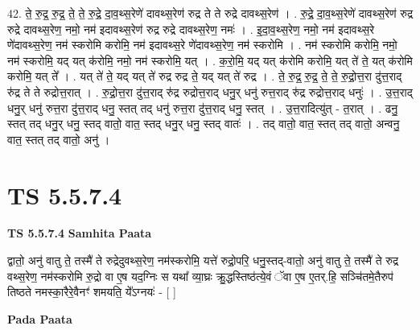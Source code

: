 \documentclass[17pt]{extarticle}
\begin{document}
42. ते॒ रु॒द्र॒ रु॒द्र॒ ते॒ ते॒ रु॒द्रे॒ दा॒व॒थ्स॒रेणे॑ दावथ्स॒रेण॑ रुद्र ते ते रुद्रे दावथ्स॒रेण॑ । . रु॒द्रे॒ दा॒व॒थ्स॒रेणे॑ दावथ्स॒रेण॑ रुद्र रुद्रे दावथ्स॒रेण॒ नमो॒ नम॑ इदावथ्स॒रेण॑ रुद्र रुद्रे दावथ्स॒रेण॒ नमः॑ । . इ॒दा॒व॒थ्स॒रेण॒ नमो॒ नम॑ इदावथ्स॒रे णे॑दावथ्स॒रेण॒ नम॑ स्करोमि करोमि॒ नम॑ इदावथ्स॒रे
णे॑दावथ्स॒रेण॒ नम॑ स्करोमि । . नम॑ स्करोमि करोमि॒ नमो॒ नम॑ स्करोमि॒ यद् यत् क॑रोमि॒ नमो॒ नम॑ स्करोमि॒ यत् । . क॒रो॒मि॒ यद् यत् क॑रोमि करोमि॒ यत् ते॑ ते॒ यत् क॑रोमि करोमि॒ यत् ते᳚ । . यत् ते॑ ते॒ यद् यत् ते॑ रुद्र रुद्र ते॒ यद् यत् ते॑ रुद्र । . ते॒ रु॒द्र॒ रु॒द्र॒ ते॒ ते॒ रु॒द्रो॒त्त॒रा दु॑त्त॒राद् रु॑द्र ते ते रुद्रोत्त॒रात् । . रु॒द्रो॒त्त॒रा दु॑त्त॒राद् रु॑द्र रुद्रोत्त॒राद् धनु॒र् धनु॑ रुत्त॒राद् रु॑द्र रुद्रोत्त॒राद् धनुः॑ । . उ॒त्त॒राद् धनु॒र् धनु॑ रुत्त॒रा दु॑त्त॒राद् धनु॒ स्तत् तद् धनु॑ रुत्त॒रा दु॑त्त॒राद् धनु॒ स्तत् । . उ॒त्त॒रादित्यु॑त् - त॒रात् । . ढनु॒ स्तत् तद् धनु॒र् धनु॒ स्तद् वातो॒ वात॒ स्तद् धनु॒र् धनु॒ स्तद् वातः॑ । . तद् वातो॒ वात॒ स्तत् तद् वातो॒ अन्वनु॒ वात॒ स्तत् तद् वातो॒ अनु॑ । \newline
\pagebreak
{}

\section{ TS 5.5.7.4 }

\textbf{TS 5.5.7.4 } \newline
\textbf{Samhita Paata} \newline

द्वातो॒ अनु॑ वातु ते॒ तस्मै॑ ते रुद्रेदुवथ्स॒रेण॒ नम॑स्करोमि॒ यत्ते॑ रुद्रो॒परि॒ धनु॒स्तद्-वातो॒ अनु॑ वातु ते॒ तस्मै॑ ते रुद्र वथ्स॒रेण॒ नम॑स्करोमि रु॒द्रो वा ए॒ष यद॒ग्निः स यथा᳚ व्या॒घ्रः क्रु॒द्धस्तिष्ठ॑त्ये॒वं ॅवा ए॒ष ए॒तर्.हि॒ सञ्चि॑तमे॒तैरुप॑ तिष्ठते नमस्का॒रैरे॒वैनꣳ॑ शमयति॒ ये᳚ऽग्नयः॑ - [  ] \newline

\textbf{Pada Paata} \newline
\end{document}
